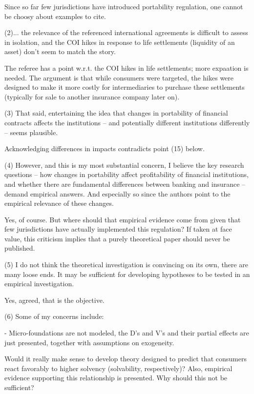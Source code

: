 Since so far few jurisdictions have introduced portability regulation, one cannot be choosy about examples to cite. 
 
(2)... the relevance of the referenced international agreements is difficult to assess in isolation, and the COI hikes in response to life settlements (liquidity of an asset) don't seem to match the story. 

The referee has a point w.r.t. the COI hikes in life settlements; more expaation is needed. The argument is that while consumers were targeted, the hikes were designed to make it more costly for intermediaries to purchase these settlements (typically for sale to another insurance company later on).  

(3) That said, entertaining the idea that changes in portability of financial contracts affects the institutions -- and potentially different institutions differently -- seems plausible.

Acknowledging differences in impacts contradicts point (15) below.

(4) However, and this is my most substantial concern, I believe the key research questions -- how changes in portability affect profitability of financial institutions, and whether there are fundamental differences between banking and insurance -- demand empirical answers. And especially so since the authors point to the empirical relevance of these changes.

Yes, of course. But where should that empirical evidence come from given that few jurisdictions have actually implemented this regulation? If taken at face value, this criticism implies that a purely theoretical paper should never be published.

(5) I do not think the theoretical investigation is convincing on its own, there are many loose ends. It may be sufficient for developing hypotheses to be tested in an empirical investigation. 

Yes, agreed, that is the objective. 

(6) Some of my concerns include:

- Micro-foundations are not modeled, the D's and V's and their partial effects are just presented, together with assumptions on exogeneity.

Would it really make sense to develop theory designed to predict that consumers react favorably to higher solvency (solvability, respectively)? Also, empirical evidence supporting this relationship is presented. Why should this not be sufficient?

